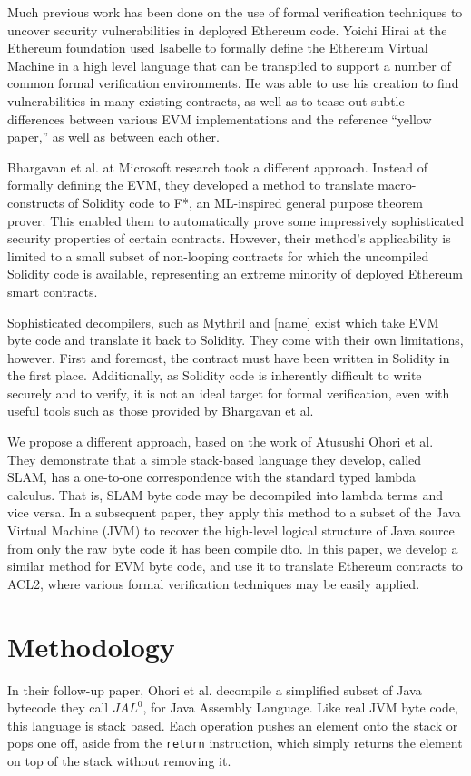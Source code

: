\documentclass[11pt]{article}
\begin{document}
Much previous work has been done on the use of formal verification techniques to uncover security vulnerabilities in deployed Ethereum code.  Yoichi Hirai at the Ethereum foundation used Isabelle to formally define the Ethereum Virtual Machine in a high level language that can be transpiled to support a number of common formal verification environments.  He was able to use his creation to find vulnerabilities in many existing contracts, as well as to tease out subtle differences between various EVM implementations and the reference “yellow paper,” as well as between each other.

Bhargavan et al. at Microsoft research took a different approach.  Instead of formally defining the EVM, they developed a method to translate macro-constructs of Solidity code to F*, an ML-inspired general purpose theorem prover.  This enabled them to automatically prove some impressively sophisticated security properties of certain contracts.  However, their method’s applicability is limited to a small subset of non-looping contracts for which the uncompiled Solidity code is available, representing an extreme minority of deployed Ethereum smart contracts.

Sophisticated decompilers, such as Mythril and [name] exist which take EVM byte code and translate it back to Solidity.  They come with their own limitations, however.  First and foremost, the contract must have been written in Solidity in the first place.  Additionally, as Solidity code is inherently difficult to write securely and to verify, it is not an ideal target for formal verification, even with useful tools such as those provided by Bhargavan et al.

We propose a different approach, based on the work of Atusushi Ohori et al.  They demonstrate that a simple stack-based language they develop, called SLAM, has a one-to-one correspondence with the standard typed lambda calculus.  That is, SLAM byte code may be decompiled into lambda terms and vice versa.  In a subsequent paper, they apply this method to a subset of the Java Virtual Machine (JVM) to recover the high-level logical structure of Java source from only the raw byte code it has been compile dto.  In this paper, we develop a similar method for EVM byte code, and use it to translate Ethereum contracts to ACL2, where various formal verification techniques may be easily applied.

\section{Methodology}
In their follow-up paper, Ohori et al. decompile a simplified subset of Java bytecode they call $JAL^0$, for Java Assembly Language.  Like real JVM byte code, this language is stack based.  Each operation pushes an element onto the stack or pops one off, aside from the \verb|return| instruction, which simply returns the element on top of the stack without removing it.
\end{document}
